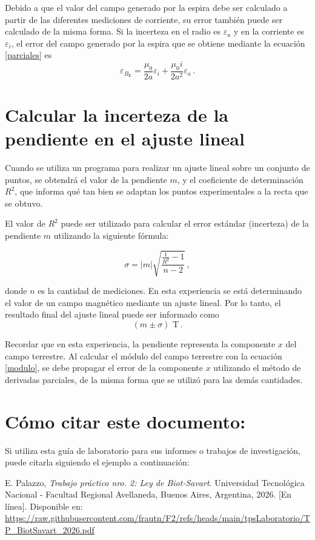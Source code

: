 \documentclass[a4paper,12pt]{article}
\begin{document}
Debido a que el valor del campo generado por la espira debe ser calculado a partir de las diferentes mediciones de corriente, su error también puede ser calculado de la misma forma. Si la incerteza en el radio es $\varepsilon_a$ y en la corriente es $\varepsilon_i$, el error del campo generado por la espira que se obtiene mediante la ecuación \ref{parciales} es
\begin{equation}
    \varepsilon_{B_\text{E}} = \frac{\mu_0}{2a}\varepsilon_i + \frac{\mu_0 i}{2a^2}\varepsilon_{a}\, .
\end{equation}

\section{Calcular la incerteza de la pendiente en el ajuste lineal}

Cuando se utiliza un programa para realizar un ajuste lineal sobre un conjunto de puntos, se obtendrá el valor de la pendiente $m$, y el coeficiente de determinación $R^2$, que informa qué tan bien se adaptan los puntos experimentales a la recta que se obtuvo.\par\medskip

El valor de $R^2$ puede ser utilizado para calcular el error estándar (incerteza) de la pendiente $m$ utilizando la siguiente fórmula:

\begin{equation}\label{eq_corriente}
    \sigma = |m| \sqrt{\frac{\frac{1}{R^2}-1}{n-2}}\, ,
\end{equation}

donde $n$ es la cantidad de mediciones. En esta experiencia se está determinando el valor de un campo magnético mediante un ajuste lineal. Por lo tanto, el resultado final del ajuste lineal puede ser informado como
\begin{equation}
    (m \pm \sigma)\text{ T}\, .
\end{equation}

Recordar que en esta experiencia, la pendiente representa la componente $x$ del campo terrestre. Al calcular el módulo del campo terrestre con la ecuación \ref{modulo}, se debe propagar el error de la componente $x$ utilizando el método de derivadas parciales, de la misma forma que se utilizó para las demás cantidades.

\section{Cómo citar este documento:}
Si utiliza esta guía de laboratorio para sus informes o trabajos de investigación, puede citarla siguiendo el ejemplo a continuación:\par\medskip

E. Palazzo, \textit{Trabajo práctico nro. 2: Ley de Biot-Savart}. Universidad Tecnológica Nacional - Facultad Regional Avellaneda, Buenos Aires, Argentina, 2026. [En línea]. Disponible en: \url{https://raw.githubusercontent.com/frautn/F2/refs/heads/main/tpsLaboratorio/TP_BiotSavart_2026.pdf}
\end{document}
